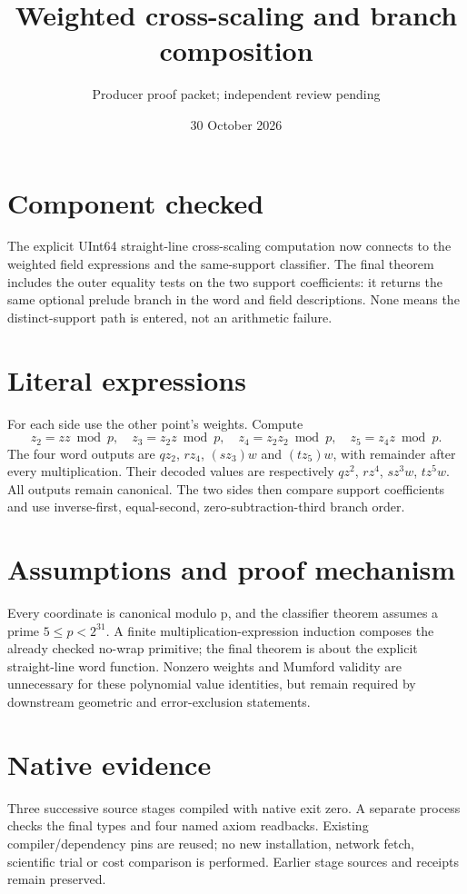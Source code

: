 \documentclass[10pt]{article}
\begin{document}
\title{Weighted cross-scaling and branch composition}
\author{Producer proof packet; independent review pending}
\date{30 October 2026}\maketitle
\section*{Component checked}
The explicit UInt64 straight-line cross-scaling computation now connects to the weighted field expressions and the same-support classifier. The final theorem includes the outer equality tests on the two support coefficients: it returns the same optional prelude branch in the word and field descriptions. None means the distinct-support path is entered, not an arithmetic failure.
\section*{Literal expressions}
For each side use the other point's weights. Compute
\[z_2=z z\bmod p,\quad z_3=z_2z\bmod p,\quad z_4=z_2z_2\bmod p,\quad z_5=z_4z\bmod p.\]
The four word outputs are $qz_2$, $rz_4$, $(sz_3)w$ and $(tz_5)w$, with remainder after every multiplication. Their decoded values are respectively $qz^2$, $rz^4$, $sz^3w$, $tz^5w$. All outputs remain canonical. The two sides then compare support coefficients and use inverse-first, equal-second, zero-subtraction-third branch order.
\section*{Assumptions and proof mechanism}
Every coordinate is canonical modulo p, and the classifier theorem assumes a prime $5\le p<2^{31}$. A finite multiplication-expression induction composes the already checked no-wrap primitive; the final theorem is about the explicit straight-line word function. Nonzero weights and Mumford validity are unnecessary for these polynomial value identities, but remain required by downstream geometric and error-exclusion statements.
\section*{Native evidence}
Three successive source stages compiled with native exit zero. A separate process checks the final types and four named axiom readbacks. Existing compiler/dependency pins are reused; no new installation, network fetch, scientific trial or cost comparison is performed. Earlier stage sources and receipts remain preserved.
\end{document}
